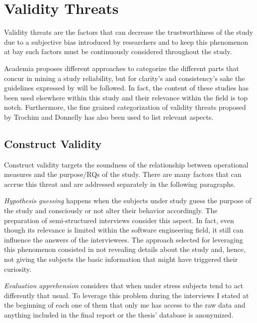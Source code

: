 \chapter{Validity Threats} \label{validity_threats}

Validity threats are the factors that can decrease the trustworthiness of the study due to a subjective bias introduced by researchers and to keep this phenomenon at bay such factors must be continuously considered throughout the study.

Academia proposes different approaches to categorize the different parts that concur in mining a study reliability, but for clarity's and consistency's sake the guidelines expressed by \cite{case_study_guide,case_study_software_engineering} will be followed. In fact, the content of these studies has been used elsewhere within this study and their relevance within the field is top notch. Furthermore, the fine grained categorization of validity threats proposed by Trochim and Donnelly \cite{validity_threats} has also been used to list relevant aspects.

\section{Construct Validity}
Construct validity targets the soundness of the relationship between operational measures and the purpose/RQs of the study. There are many factors that can accrue this threat and are addressed separately in the following paragraphs.


    \textit{Hypothesis guessing} happens when the subjects under study guess the purpose of the study and consciously or not alter their behavior accordingly. The preparation of semi-structured interviews consider this aspect. In fact, even though its relevance is limited within the software engineering field, it still can influence the answers of the interviewees. The approach selected for leveraging this phenomenon consisted in not revealing details about the study and, hence, not giving the subjects the basic information that might have triggered their curiosity.
    
    \textit{Evaluation apprehension} considers that when under stress subjects tend to act differently that usual. To leverage this problem during the interviews I stated at the beginning of each one of them that only me has access to the raw data and anything included in the final report or the thesis' database is anonymized.
    

